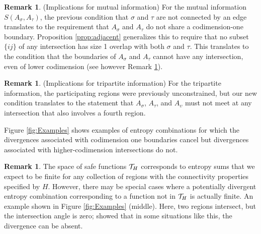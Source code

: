 \documentclass[12pt]{article}
\theoremstyle{definition}
\newtheorem{remark}[theorem]{Remark}
\begin{document}
\begin{remark} (Implications for mutual information)
    For the mutual information $S(A_\sigma, A_\tau)$, the previous condition that $\sigma$ and $\tau$ are not connected by an edge translates to the requirement that $A_\sigma$ and $A_\tau$ do not share a codimension-one boundary. Proposition \ref{prop:adjacent} generalizes this to require that no subset $\{ij\}$ of any intersection has size 1 overlap with both $\sigma$ and $\tau$. This translates to the condition that the boundaries of $A_\sigma$ and $A_\tau$ cannot have any intersection, even of lower codimension (see however Remark \ref{caveat}). 
\end{remark}
\begin{remark} (Implications for tripartite information)
    For the tripartite information, the participating regions were previously unconstrained, but our new condition translates to the statement that  $A_\sigma$, $A_\tau$, and $A_\upsilon$ must not meet at any intersection that also involves a fourth region.
\end{remark}
Figure \ref{fig:Examples} shows examples of entropy combinations for which the divergences associated with codimension one boundaries cancel but divergences associated with higher-codimension intersections do not.
\begin{remark}
\label{caveat}
    The space of safe functions ${\cal T}_H$ corresponds to entropy sums that we expect to be finite for any collection of regions with the connectivity properties specified by $H$. However, there may be special cases where a potentially divergent entropy combination corresponding to a function not in ${\cal T}_H$ is actually finite. An example shown in Figure \ref{fig:Examples} (middle). Here, two regions intersect, but the intersection angle is zero; \cite{BuenoCasiniWitczak2019_SingularJHEP} showed that in some situations like this, the divergence can be absent. 
\end{remark}
\end{document}

